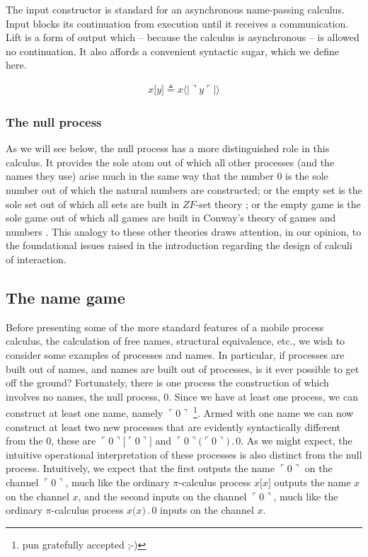 \documentclass[]{entcs}
\newcommand{\lliftb}{\langle\!|}
\newcommand{\rliftb}{|\!\rangle}
\newcommand{\lpquote}{\ulcorner}
\newcommand{\rpquote}{\urcorner}
\newcommand{\id}[1]{\texttt{#1}}
\newcommand{\concat}{\mathbin{.}}
\newcommand{\lift}[2]{#1 \lliftb #2 \rliftb}
\newcommand{\quotep}[1]{\lpquote #1 \rpquote}
\newcommand{\dropn}[1]{\rpquote #1 \lpquote}
\newcommand{\pic}{$\pi$-calculus}
\begin{document}
The input constructor is standard for an asynchronous name-passing
calculus. Input blocks its continuation from execution until it
receives a communication. Lift is a form of output which -- because
the calculus is asynchronous -- is allowed no continuation. It also
affords a convenient syntactic sugar, which we define here.

\begin{eqnarray}
	{x}\id{[}{y}\id{]} \triangleq \lift{x}{\dropn{y}} \nonumber
\end{eqnarray}

\subsubsection{The null process}

As we will see below, the null process has a more distinguished role
in this calculus. It provides the sole atom out of which all other
processes (and the names they use) arise much in the same way that the
number $0$ is the sole number out of which the natural numbers are
constructed; or the empty set is the sole set out of which all sets
are built in $ZF$-set theory \cite{Krivine-TheCurryHowardCorre}; or
the empty game is the sole game out of which all games are built in
Conway's theory of games and numbers \cite{ONAG}. This analogy to
these other theories draws attention, in our opinion, to the
foundational issues raised in the introduction regarding the design of
calculi of interaction.

\subsection{The name game}

Before presenting some of the more standard features of a mobile
process calculus, the calculation of free names, structural
equivalence, etc., we wish to consider some examples of processes and
names. In particular, if processes are built out of names, and names
are built out of processes, is it ever possible to get off the ground?
Fortunately, there is one process the construction of which involves
no names, the null process, $0$. Since we have at least one process,
we can construct at least one name, namely $\quotep{0}$ \footnote{pun
gratefully accepted ;-)}. Armed with one name we can now construct at
least two new processes that are evidently syntactically different
from the $0$, these are $\quotep{0}\id{[}{\quotep{0}}\id{]}$ and
$\quotep{0}\id{(}{\quotep{0}}\id{)} \concat 0$. As we might expect,
the intuitive operational interpretation of these processes is also
distinct from the null process. Intuitively, we expect that the first
outputs the name $\quotep{0}$ on the channel $\quotep{0}$, much like
the ordinary {\pic} process $x\id{[}x\id{]}$ outputs the name $x$ on
the channel $x$, and the second inputs on the channel $\quotep{0}$,
much like the ordinary {\pic} process $x\id{(}x\id{)} \concat 0$
inputs on the channel $x$.
\end{document}
